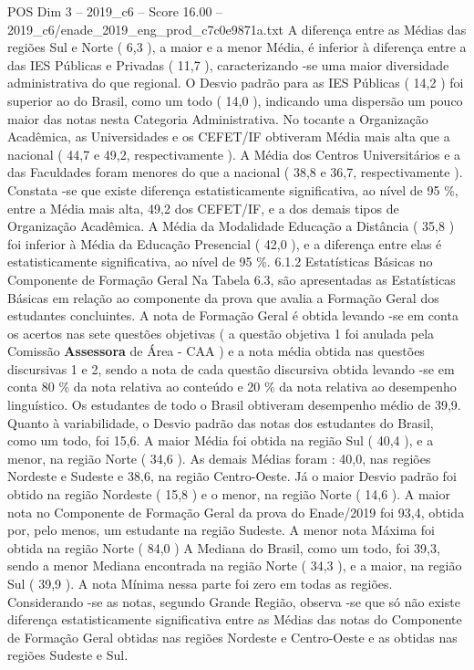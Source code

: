 \begin{textsample}{POS Dim 3 – 2019\_c6 – Score 16.00 – 2019\_c6/enade\_2019\_eng\_prod\_c7c0e9871a.txt}
A diferença entre as Médias das regiões Sul e Norte ( 6,3 ), a maior e a menor Média, é inferior à diferença entre a das IES Públicas e Privadas ( 11,7 ), caracterizando -se uma maior diversidade administrativa do que regional.
O Desvio padrão para as IES Públicas ( 14,2 ) foi superior ao do Brasil, como um todo ( 14,0 ), indicando uma dispersão um pouco maior das notas nesta Categoria Administrativa.
No tocante a Organização Acadêmica, as Universidades e os CEFET/IF obtiveram Média mais alta que a nacional ( 44,7 e 49,2, respectivamente ).
A Média dos Centros Universitários e a das Faculdades foram menores do que a nacional ( 38,8 e 36,7, respectivamente ).
Constata -se que existe diferença estatisticamente significativa, ao nível de 95 \%, entre a Média mais alta, 49,2 dos CEFET/IF, e a dos demais tipos de Organização Acadêmica.
A Média da Modalidade Educação a Distância ( 35,8 ) foi inferior à Média da Educação Presencial ( 42,0 ), e a diferença entre elas é estatisticamente significativa, ao nível de 95 \%. 6.1.2 Estatísticas Básicas no Componente de Formação Geral Na Tabela 6.3, são apresentadas as Estatísticas Básicas em relação ao componente da prova que avalia a Formação Geral dos estudantes concluintes.
A nota de Formação Geral é obtida levando -se em conta os acertos nas sete questões objetivas ( a questão objetiva 1 foi anulada pela Comissão \textbf{Assessora} de Área - CAA ) e a nota média obtida nas questões discursivas 1 e 2, sendo a nota de cada questão discursiva obtida levando -se em conta 80 \% da nota relativa ao conteúdo e 20 \% da nota relativa ao desempenho linguístico.
Os estudantes de todo o Brasil obtiveram desempenho médio de 39,9.
Quanto à variabilidade, o Desvio padrão das notas dos estudantes do Brasil, como um todo, foi 15,6.
A maior Média foi obtida na região Sul ( 40,4 ), e a menor, na região Norte ( 34,6 ).
As demais Médias foram : 40,0, nas regiões Nordeste e Sudeste e 38,6, na região Centro-Oeste.
Já o maior Desvio padrão foi obtido na região Nordeste ( 15,8 ) e o menor, na região Norte ( 14,6 ).
A maior nota no Componente de Formação Geral da prova do Enade/2019 foi 93,4, obtida por, pelo menos, um estudante na região Sudeste.
A menor nota Máxima foi obtida na região Norte ( 84,0 ) A Mediana do Brasil, como um todo, foi 39,3, sendo a menor Mediana encontrada na região Norte ( 34,3 ), e a maior, na região Sul ( 39,9 ).
A nota Mínima nessa parte foi zero em todas as regiões.
Considerando -se as notas, segundo Grande Região, observa -se que só não existe diferença estatisticamente significativa entre as Médias das notas do Componente de Formação Geral obtidas nas regiões Nordeste e Centro-Oeste e as obtidas nas regiões Sudeste e Sul.

\end{textsample}
